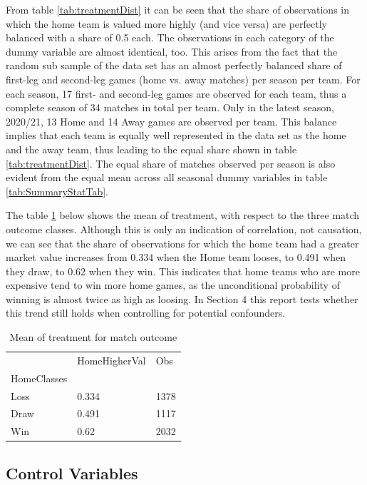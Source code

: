 \documentclass[11pt]{article}
\begin{document}
From table \ref{tab:treatmentDist} it can be seen that the share of observations in which the home team is valued more highly (and vice versa) are perfectly balanced with a share of 0.5 each. The observations in each category of the dummy variable are almost identical, too. This arises from the fact that the random sub sample of the data set has an almost perfectly balanced share of first-leg and second-leg games (home vs. away matches) per season per team. For each season, 17 first- and second-leg games are observed for each team, thus a complete season of 34 matches in total per team. Only in the latest season, 2020/21, 13 Home and 14 Away games are observed per team. This balance implies that each team is equally well represented in the data set as the home and the away team, thus leading to the equal share shown in table \ref{tab:treatmentDist}. The equal share of matches observed per season is also evident from the equal mean across all seasonal dummy variables in table \ref{tab:SummaryStatTab}.

The table \ref{tab:treatmentOutcome} below shows the mean of treatment, with respect to the three match outcome classes. Although this is only an indication of correlation, not causation, we can see that the share of observations for which the home team had a greater market value increases from 0.334 when the Home team looses, to 0.491 when they draw, to 0.62 when they win. This indicates that home teams who are more expensive tend to win more home games, as the unconditional probability of winning is almost twice as high as loosing. In Section 4 this report tests whether this trend still holds when controlling for potential confounders.

\begin{table}[ht]
\centering
	\begin{tabular}{lll}
	\toprule
	{} & HomeHigherVal &   Obs \\
	HomeClasses &               &       \\
	\midrule
	Loss          &         0.334 &  1378 \\
	Draw           &         0.491 &  1117 \\
	Win           &          0.62 &  2032 \\
	\bottomrule
	\end{tabular}
\caption{Mean of treatment for match outcome}
\label{tab:treatmentOutcome}
\end{table}

\subsection{Control Variables}
\end{document}
